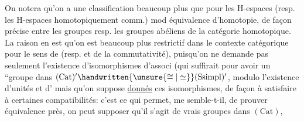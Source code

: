 On notera qu'on a une  classification beaucoup plus  que pour les H-espaces (resp. les H-espaces homotopiquement comm.) mod équivalence d'homotopie, de façon précise entre les groupes resp. les groupes abéliens de la catégorie homotopique. La raison en est qu'on est beaucoup plus restrictif dans le contexte catégorique pour le sens de  (resp. et de la commutativité), puisqu'on ne demande pas seulement l'existence d'isomorphismes d'associ\deleted{\unsure{,|$\times$}} (qui suffirait pour avoir un ``groupe dans  $(\mathrm{Cat})'\handwritten{\unsure{\cong|\simeq}}(\mathrm{Ssimpl})'$, modulo l'existence d'unités et d' mais qu'on suppose \uline{donnés} ces isomorphismes, de façon à satisfaire à certaines compatibilités: c'est ce qui permet, me semble-t-il, de prouver  équivalence près, on peut supposer qu'il s'agit de vrais groupes dans $(\mathrm{Cat})$, 

